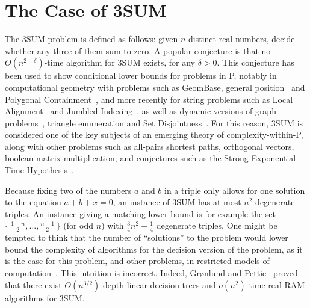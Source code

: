 \section{The Case of 3SUM}

The 3SUM problem is defined as follows: given $n$ distinct real numbers, decide
whether any three of them sum to zero.
%
A popular conjecture is that no $O(n^{2-\delta})$-time algorithm for 3SUM
exists, for any $\delta > 0$. This conjecture has been used to show conditional
lower bounds for problems in P, notably in computational geometry with problems
such as
GeomBase, general position~\cite{GO95}
and
Polygonal Containment~\cite{BH01},
and more recently for string problems such as
Local Alignment~\cite{AVW14}
and
Jumbled Indexing~\cite{ACLL14},
as well as
dynamic versions of graph problems~\cite{P10,AV14},
triangle enumeration and Set Disjointness~\cite{KPP16}.
%
For this reason, 3SUM is considered one of the key subjects of an
emerging theory of complexity-within-P, along with other problems such as
all-pairs shortest paths,
orthogonal vectors,
boolean matrix multiplication,
and conjectures such as
the Strong Exponential Time Hypothesis~\cite{AVY15,HKNS15,CGIMPS16}.

Because fixing two of the numbers $a$ and $b$ in a triple only allows for one
solution to the equation $a + b + x = 0$, an instance of 3SUM has at most
$n^2$ degenerate triples. An instance giving a matching lower bound is for
example the set $\{\,\frac{1-n}{2},\ldots,\frac{n-1}{2}\,\}$ (for odd $n$)
with $\frac{3}{4} n^2 + \frac 14$ degenerate triples.
%
One might be tempted to think that the number of ``solutions'' to the problem
would lower bound the complexity of algorithms for the decision version of the
problem, as it is the case for this problem, and other problems, in restricted
models of computation~\cite{Er96,Er99}.
%
This intuition is incorrect.
%
Indeed, Gr\o nlund and Pettie~\cite{GP18} proved that there exist
$\tilde{O}(n^{3/2})$-depth linear decision trees and $o(n^2)$-time real-RAM
algorithms for 3SUM\@.
